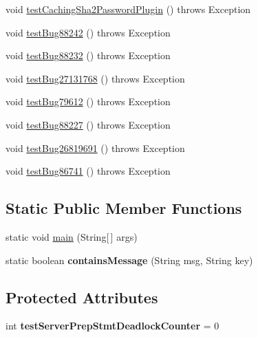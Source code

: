\begin{DoxyCompactItemize}
void \mbox{\hyperlink{classtestsuite_1_1regression_1_1_connection_regression_test_a263450ae42667048cb087d436159096d}{test\+Caching\+Sha2\+Password\+Plugin}} ()  throws Exception 
\item 
void \mbox{\hyperlink{classtestsuite_1_1regression_1_1_connection_regression_test_a55b53a4466ee01be0e4523d8f8ad0fb9}{test\+Bug88242}} ()  throws Exception 
\item 
void \mbox{\hyperlink{classtestsuite_1_1regression_1_1_connection_regression_test_a8f012d97b51e3128e7e1077cb0735a77}{test\+Bug88232}} ()  throws Exception 
\item 
void \mbox{\hyperlink{classtestsuite_1_1regression_1_1_connection_regression_test_a460de861e61f26582dca4e5b65fc267c}{test\+Bug27131768}} ()  throws Exception 
\item 
void \mbox{\hyperlink{classtestsuite_1_1regression_1_1_connection_regression_test_ab8f8f7ed64d0a02e23c0ed5ebafc2fbc}{test\+Bug79612}} ()  throws Exception 
\item 
void \mbox{\hyperlink{classtestsuite_1_1regression_1_1_connection_regression_test_aa96e95ebbaaac4aad6e1bbc4df86bede}{test\+Bug88227}} ()  throws Exception 
\item 
void \mbox{\hyperlink{classtestsuite_1_1regression_1_1_connection_regression_test_af42d87028dfc5fe504f1cf4457c21d53}{test\+Bug26819691}} ()  throws Exception 
\item 
void \mbox{\hyperlink{classtestsuite_1_1regression_1_1_connection_regression_test_a918e9c3c8af63f994256ad99ebe9898d}{test\+Bug86741}} ()  throws Exception 
\end{DoxyCompactItemize}
\subsection*{Static Public Member Functions}
\begin{DoxyCompactItemize}
\item 
static void \mbox{\hyperlink{classtestsuite_1_1regression_1_1_connection_regression_test_a07f235ef52b2330590e2069478598e41}{main}} (String\mbox{[}$\,$\mbox{]} args)
\item 
\mbox{\label{classtestsuite_1_1regression_1_1_connection_regression_test_ac9b394063b52338bbdb0a9666b6aca23}} 
static boolean {\bfseries contains\+Message} (String msg, String key)
\end{DoxyCompactItemize}
\subsection*{Protected Attributes}
\begin{DoxyCompactItemize}
\item 
\mbox{\label{classtestsuite_1_1regression_1_1_connection_regression_test_abbdb58ac7596236d509c07f48d6dc396}} 
int {\bfseries test\+Server\+Prep\+Stmt\+Deadlock\+Counter} = 0
\end{DoxyCompactItemize}
